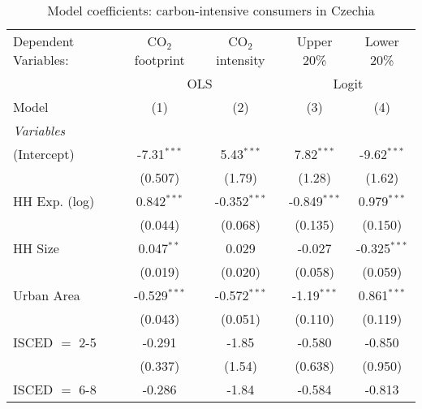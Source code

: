 
\begin{table}[htbp!]
   \centering
   \small
   \begin{adjustbox}{width = 1\textwidth, max height = 0.95\textheight, center}
      \begin{threeparttable}[b]
         \caption{\label{tab:Logit_1_CZE} Model coefficients: carbon-intensive consumers in Czechia}
         \begin{tabular}{lcccc}
            \tabularnewline \midrule \midrule
            Dependent Variables: & CO$_{2}$ footprint & CO$_{2}$ intensity & Upper 20\%     & Lower 20\%\\   
             & \multicolumn{2}{c}{OLS} & \multicolumn{2}{c}{Logit} \\ 
            Model                & (1)                & (2)                & (3)            & (4)\\  
            \midrule
            \emph{Variables}\\
            (Intercept)          & -7.31$^{***}$      & 5.43$^{***}$       & 7.82$^{***}$   & -9.62$^{***}$\\   
                                 & (0.507)            & (1.79)             & (1.28)         & (1.62)\\   
            HH Exp. (log)        & 0.842$^{***}$      & -0.352$^{***}$     & -0.849$^{***}$ & 0.979$^{***}$\\   
                                 & (0.044)            & (0.068)            & (0.135)        & (0.150)\\   
            HH Size              & 0.047$^{**}$       & 0.029              & -0.027         & -0.325$^{***}$\\   
                                 & (0.019)            & (0.020)            & (0.058)        & (0.059)\\   
            Urban Area           & -0.529$^{***}$     & -0.572$^{***}$     & -1.19$^{***}$  & 0.861$^{***}$\\   
                                 & (0.043)            & (0.051)            & (0.110)        & (0.119)\\   
            ISCED $=$ 2-5        & -0.291             & -1.85              & -0.580         & -0.850\\   
                                 & (0.337)            & (1.54)             & (0.638)        & (0.950)\\   
            ISCED $=$ 6-8        & -0.286             & -1.84              & -0.584         & -0.813\\   

\end{tabular}
\end{threeparttable}
\end{adjustbox}
\end{table}
